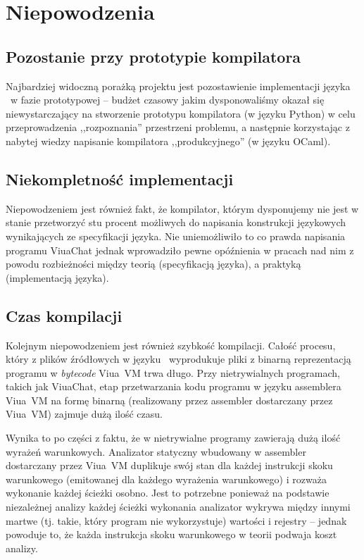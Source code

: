 \section{Niepowodzenia}

\subsection{Pozostanie przy prototypie kompilatora}

Najbardziej widoczną porażką projektu jest pozostawienie implementacji języka
\ViuAct\ w fazie prototypowej -- budżet czasowy jakim dysponowaliśmy okazał się
niewystarczający na stworzenie prototypu kompilatora (w języku Python) w celu
przeprowadzenia ,,rozpoznania'' przestrzeni problemu, a następnie korzystając z
nabytej wiedzy napisanie kompilatora ,,produkcyjnego'' (w języku OCaml).

\subsection{Niekompletność implementacji}

Niepowodzeniem jest również fakt, że kompilator, którym dysponujemy nie jest w
stanie przetworzyć stu procent możliwych do napisania konstrukcji językowych
wynikających ze specyfikacji języka. Nie uniemożliwiło to co prawda napisania
programu ViuaChat jednak wprowadziło pewne opóźnienia w pracach nad nim z powodu
rozbieżności między teorią (specyfikacją języka), a praktyką (implementacją
języka).

\subsection{Czas kompilacji}

Kolejnym niepowodzeniem jest również szybkość kompilacji. Całość procesu, który
z plików źródłowych w języku \ViuAct\ wyprodukuje pliki z binarną reprezentacją
programu w \emph{bytecode} Viua~VM trwa długo. Przy nietrywialnych programach,
takich jak ViuaChat, etap przetwarzania kodu programu w języku assemblera
Viua~VM na formę binarną (realizowany przez assembler dostarczany przez Viua~VM)
zajmuje dużą ilość czasu.

Wynika to po części z faktu, że w nietrywialne programy zawierają dużą ilość
wyrażeń warunkowych. Analizator statyczny wbudowany w assembler dostarczany
przez Viua~VM duplikuje swój stan dla każdej instrukcji skoku warunkowego
(emitowanej dla każdego wyrażenia warunkowego) i rozważa wykonanie każdej
ścieżki osobno.
Jest to potrzebne ponieważ na podstawie niezależnej analizy każdej ścieżki
wykonania analizator wykrywa między innymi martwe (tj. takie, który program nie
wykorzystuje) wartości i rejestry -- jednak powoduje to, że każda instrukcja
skoku warunkowego w teorii podwaja koszt analizy.

